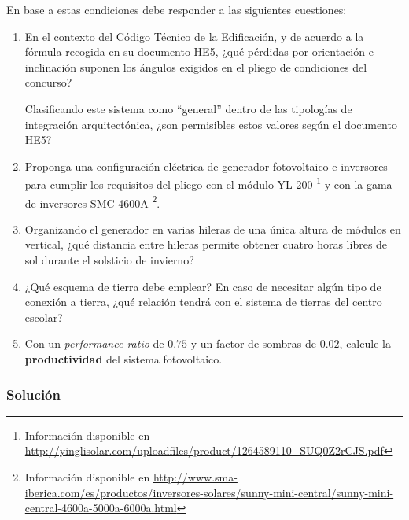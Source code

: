 En base a estas condiciones debe responder a las siguientes
cuestiones:

\begin{enumerate}
\item En el contexto del Código Técnico de la Edificación, y de
  acuerdo a la fórmula recogida en su documento HE5, ¿qué pérdidas por
  orientación e inclinación suponen los ángulos exigidos en el pliego
  de condiciones del concurso?

  Clasificando este sistema como ``general'' dentro de las tipologías
  de integración arquitectónica, ¿son permisibles estos valores según
  el documento HE5?
\item Proponga una configuración eléctrica de generador fotovoltaico e
  inversores para cumplir los requisitos del pliego con el módulo
  YL-200%
\footnote{Información disponible en
  \url{http://yinglisolar.com/uploadfiles/product/1264589110_SUQ0Z2rCJS.pdf}}
 y con la gama de inversores SMC 4600A%
\footnote{Información
   disponible en \url{http://www.sma-iberica.com/es/productos/inversores-solares/sunny-mini-central/sunny-mini-central-4600a-5000a-6000a.html}}.
\item Organizando el generador en varias hileras de una única altura
  de módulos en vertical, ¿qué distancia entre hileras permite obtener
  cuatro horas libres de sol durante el solsticio de invierno?
\item ¿Qué esquema de tierra debe emplear? En caso de necesitar algún
  tipo de conexión a tierra, ¿qué relación tendrá con el sistema de
  tierras del centro escolar?
\item Con un \emph{performance ratio} de $0.75$ y un factor de sombras
  de $0.02$, calcule la \textbf{productividad} del sistema
  fotovoltaico.
\end{enumerate}

\subsubsection{Solución}

